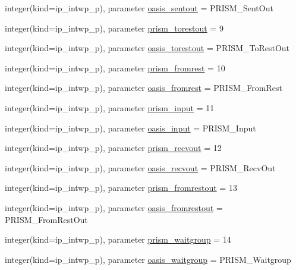 \begin{DoxyCompactItemize}
\item 
integer(kind=ip\+\_\+intwp\+\_\+p), parameter \hyperlink{namespacemod__oasis__parameters_a1804e9b27d8d7ace38fd4c3f99ade6dd}{oasis\+\_\+sentout} = P\+R\+I\+S\+M\+\_\+\+Sent\+Out
\item 
integer(kind=ip\+\_\+intwp\+\_\+p), parameter \hyperlink{namespacemod__oasis__parameters_a9ed7a0f0a9392248de5b4b15849843df}{prism\+\_\+torestout} = 9
\item 
integer(kind=ip\+\_\+intwp\+\_\+p), parameter \hyperlink{namespacemod__oasis__parameters_a390018877602efede436bd0721add299}{oasis\+\_\+torestout} = P\+R\+I\+S\+M\+\_\+\+To\+Rest\+Out
\item 
integer(kind=ip\+\_\+intwp\+\_\+p), parameter \hyperlink{namespacemod__oasis__parameters_ad77e6f35280cf4e306f818f9ec815441}{prism\+\_\+fromrest} = 10
\item 
integer(kind=ip\+\_\+intwp\+\_\+p), parameter \hyperlink{namespacemod__oasis__parameters_aa0584909970d34364b7ec319292b1682}{oasis\+\_\+fromrest} = P\+R\+I\+S\+M\+\_\+\+From\+Rest
\item 
integer(kind=ip\+\_\+intwp\+\_\+p), parameter \hyperlink{namespacemod__oasis__parameters_aa9009f13473f2cb6476c2fb5e4963243}{prism\+\_\+input} = 11
\item 
integer(kind=ip\+\_\+intwp\+\_\+p), parameter \hyperlink{namespacemod__oasis__parameters_ae65ca856d776de249fc624b2d76bc4e8}{oasis\+\_\+input} = P\+R\+I\+S\+M\+\_\+\+Input
\item 
integer(kind=ip\+\_\+intwp\+\_\+p), parameter \hyperlink{namespacemod__oasis__parameters_ab56f2573ea7fd626f24e42606f4745a2}{prism\+\_\+recvout} = 12
\item 
integer(kind=ip\+\_\+intwp\+\_\+p), parameter \hyperlink{namespacemod__oasis__parameters_ac7406e7f558491599acfbb6f4628f811}{oasis\+\_\+recvout} = P\+R\+I\+S\+M\+\_\+\+Recv\+Out
\item 
integer(kind=ip\+\_\+intwp\+\_\+p), parameter \hyperlink{namespacemod__oasis__parameters_ac989a8af875dd1765b1369814fd4eb9d}{prism\+\_\+fromrestout} = 13
\item 
integer(kind=ip\+\_\+intwp\+\_\+p), parameter \hyperlink{namespacemod__oasis__parameters_a76a87a170e0c08863ae981693eb88fb8}{oasis\+\_\+fromrestout} = P\+R\+I\+S\+M\+\_\+\+From\+Rest\+Out
\item 
integer(kind=ip\+\_\+intwp\+\_\+p), parameter \hyperlink{namespacemod__oasis__parameters_ae5cbdfb558e82bfb8695a8cf425780cb}{prism\+\_\+waitgroup} = 14
\item 
integer(kind=ip\+\_\+intwp\+\_\+p), parameter \hyperlink{namespacemod__oasis__parameters_a2cc23572d33c536d49a53587359b68f0}{oasis\+\_\+waitgroup} = P\+R\+I\+S\+M\+\_\+\+Waitgroup

\end{DoxyCompactItemize}
